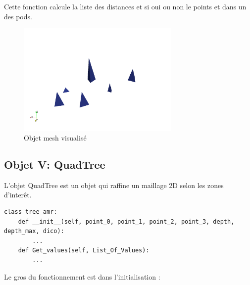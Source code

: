 \documentclass[french]{article}
\begin{document}
Cette fonction calcule la liste des distances et si oui ou non le points et dans un des pods.

\begin{figure}[h]
	\centering
	\includegraphics[width=0.7\textwidth]{Figures/Deffensezone.png}
	\caption{Objet mesh visualisé}
\end{figure}

\subsection{Objet V: QuadTree}

L'objet QuadTree est un objet qui raffine un maillage 2D selon les zones d'interêt.
\begin{verbatim}
class tree_amr:
	def __init__(self, point_0, point_1, point_2, point_3, depth, depth_max, dico):
		...
	def Get_values(self, List_Of_Values):
		...
\end{verbatim}

Le gros du fonctionnement est dans l'initialisation :
\end{document}

